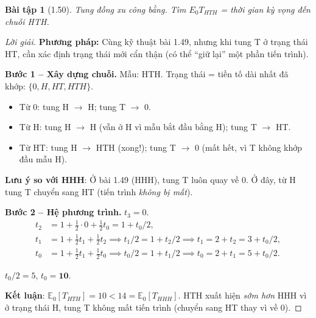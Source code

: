 \documentclass[8pt,a4paper]{article}
\newtheorem{exercise}{Bài tập}
\newenvironment{solution}{\begin{proof}[Lời giải]}{\end{proof}}
\newcommand{\E}{\mathbb{E}}
\begin{document}
\begin{exercise}[1.50]
Tung đồng xu công bằng. Tìm $E_0 T_{HTH}$ = thời gian kỳ vọng đến chuỗi HTH.
\end{exercise}
\begin{solution}
\textbf{Phương pháp:} Cùng kỹ thuật bài 1.49, nhưng khi tung T ở trạng thái HT, cần xác định trạng thái mới cẩn thận (có thể ``giữ lại'' một phần tiến trình).

\textbf{Bước 1 -- Xây dựng chuỗi.}
Mẫu: HTH. Trạng thái = tiền tố dài nhất đã khớp: $\{0, H, HT, HTH\}$.
\begin{itemize}
  \item Từ 0: tung H $\to$ H; tung T $\to$ 0.
  \item Từ H: tung H $\to$ H (vẫn ở H vì mẫu bắt đầu bằng H); tung T $\to$ HT.
  \item Từ HT: tung H $\to$ HTH (xong!); tung T $\to$ 0 (mất hết, vì T không khớp đầu mẫu H).
\end{itemize}

\textbf{Lưu ý so với HHH}: Ở bài 1.49 (HHH), tung T luôn quay về 0. Ở đây, từ H tung T chuyển sang HT (tiến trình \emph{không bị mất}).

\textbf{Bước 2 -- Hệ phương trình.} $t_3 = 0$.
\begin{align*}
  t_2 &= 1 + \tfrac{1}{2} \cdot 0 + \tfrac{1}{2} t_0 = 1 + t_0/2, \\
  t_1 &= 1 + \tfrac{1}{2} t_1 + \tfrac{1}{2} t_2 \implies t_1/2 = 1 + t_2/2 \implies t_1 = 2 + t_2 = 3 + t_0/2, \\
  t_0 &= 1 + \tfrac{1}{2} t_1 + \tfrac{1}{2} t_0 \implies t_0/2 = 1 + t_1/2 \implies t_0 = 2 + t_1 = 5 + t_0/2.
\end{align*}

$t_0/2 = 5$, $t_0 = \mathbf{10}$.

\textbf{Kết luận}: $\E_0[T_{HTH}] = 10 < 14 = \E_0[T_{HHH}]$. HTH xuất hiện \emph{sớm hơn} HHH vì ở trạng thái H, tung T không mất tiến trình (chuyển sang HT thay vì về 0).
\end{solution}
\end{document}
